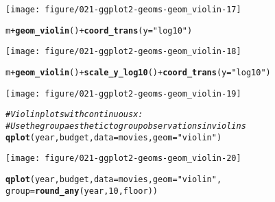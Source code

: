 \documentclass[a4paper,titlepage]{tufte-handout}\usepackage[]{graphicx}\usepackage[]{color}
\makeatletter
\def\maxwidth{ %
  \ifdim\Gin@nat@width>\linewidth
    \linewidth
  \else
    \Gin@nat@width
  \fi
}
\newcommand{\hlnum}[1]{\textcolor[rgb]{0.686,0.059,0.569}{#1}}%
\newcommand{\hlstr}[1]{\textcolor[rgb]{0.192,0.494,0.8}{#1}}%
\newcommand{\hlcom}[1]{\textcolor[rgb]{0.678,0.584,0.686}{\textit{#1}}}%
\newcommand{\hlopt}[1]{\textcolor[rgb]{0,0,0}{#1}}%
\newcommand{\hlstd}[1]{\textcolor[rgb]{0.345,0.345,0.345}{#1}}%
\newcommand{\hlkwc}[1]{\textcolor[rgb]{0.333,0.667,0.333}{#1}}%
\newcommand{\hlkwd}[1]{\textcolor[rgb]{0.737,0.353,0.396}{\textbf{#1}}}%
\newenvironment{kframe}{%
 \def\at@end@of@kframe{}%
 \ifinner\ifhmode%
  \def\at@end@of@kframe{\end{minipage}}%
  \begin{minipage}{\columnwidth}%
 \fi\fi%
 \def\FrameCommand##1{\hskip\@totalleftmargin \hskip-\fboxsep
 \colorbox{shadecolor}{##1}\hskip-\fboxsep
     \hskip-\linewidth \hskip-\@totalleftmargin \hskip\columnwidth}%
 \MakeFramed {\advance\hsize-\width
   \@totalleftmargin\z@ \linewidth\hsize
   \@setminipage}}%
 {\par\unskip\endMakeFramed%
 \at@end@of@kframe}
\newenvironment{knitrout}{}{} %
\makeatother
\begin{document}
\begin{knitrout}
\begin{kframe}
{\ttfamily\noindent\color{warningcolor}{\#\# Warning in loop\_apply(n, do.ply): position\_dodge requires constant width: output may be incorrect}}\end{kframe}
\texttt{[image: figure/021-ggplot2-geoms-geom\_violin-17]} 
\begin{kframe}\begin{alltt}
\hlstd{m} \hlopt{+} \hlkwd{geom_violin}\hlstd{()} \hlopt{+} \hlkwd{coord_trans}\hlstd{(}\hlkwc{y} \hlstd{=} \hlstr{"log10"}\hlstd{)}
\end{alltt}


{\ttfamily\noindent\color{warningcolor}{\#\# Warning in loop\_apply(n, do.ply): position\_dodge requires constant width: output may be incorrect}}\end{kframe}
\texttt{[image: figure/021-ggplot2-geoms-geom\_violin-18]} 
\begin{kframe}\begin{alltt}
\hlstd{m} \hlopt{+} \hlkwd{geom_violin}\hlstd{()} \hlopt{+} \hlkwd{scale_y_log10}\hlstd{()} \hlopt{+} \hlkwd{coord_trans}\hlstd{(}\hlkwc{y} \hlstd{=} \hlstr{"log10"}\hlstd{)}
\end{alltt}


{\ttfamily\noindent\color{warningcolor}{\#\# Warning in loop\_apply(n, do.ply): position\_dodge requires constant width: output may be incorrect}}\end{kframe}
\texttt{[image: figure/021-ggplot2-geoms-geom\_violin-19]} 
\begin{kframe}\begin{alltt}
\hlcom{# Violin plots with continuous x:}
\hlcom{# Use the group aesthetic to group observations in violins}
\hlkwd{qplot}\hlstd{(year, budget,} \hlkwc{data} \hlstd{= movies,} \hlkwc{geom} \hlstd{=} \hlstr{"violin"}\hlstd{)}
\end{alltt}


{\ttfamily\noindent\color{warningcolor}{\#\# Warning in loop\_apply(n, do.ply): Removed 53573 rows containing non-finite values (stat\_ydensity).}}\end{kframe}
\texttt{[image: figure/021-ggplot2-geoms-geom\_violin-20]} 
\begin{kframe}\begin{alltt}
\hlkwd{qplot}\hlstd{(year, budget,} \hlkwc{data} \hlstd{= movies,} \hlkwc{geom} \hlstd{=} \hlstr{"violin"}\hlstd{,}
  \hlkwc{group} \hlstd{=} \hlkwd{round_any}\hlstd{(year,} \hlnum{10}\hlstd{, floor))}
\end{alltt}



\end{kframe}
\end{knitrout}
\end{document}
